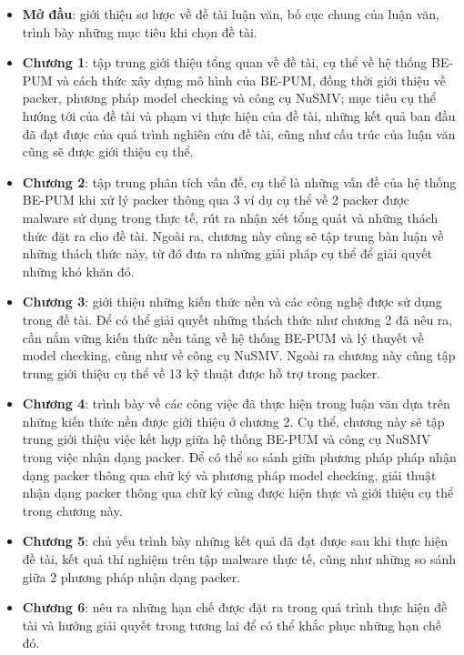 \begin{itemize}
\item{\textbf{Mở đầu}: giới thiệu sơ lược về đề tài luận văn, bố cục chung của luận văn, trình bày những mục tiêu khi chọn đề tài.\\}
\item{\textbf{Chương 1}: tập trung giới thiệu tổng quan về đề tài, cụ thể về hệ thống BE-PUM và cách thức xây dựng mô hình của BE-PUM, đồng thời giới thiệu về packer, phương pháp model checking và công cụ NuSMV; mục tiêu cụ thể hướng tới của đề tài và phạm vi thực hiện của đề tài, những kết quả ban đầu đã đạt được của quá trình nghiên cứu đề tài, cũng như cấu trúc của luận văn cũng sẽ được giới thiệu cụ thể.\\}
\item{\textbf{Chương 2}: tập trung phân tích vấn đề, cụ thể là những vấn đề của hệ thống BE-PUM khi xử lý packer thông qua 3 ví dụ cụ thể về 2 packer được malware sử dụng trong thực tế, rút ra nhận xét tổng quát và những thách thức đặt ra cho đề tài. Ngoài ra, chương này cũng sẽ tập trung bàn luận về những thách thức này, từ đó đưa ra những giải pháp cụ thể để giải quyết những khó khăn đó.\\}
\item{\textbf{Chương 3}: giới thiệu những kiến thức nền và các công nghệ được sử dụng trong đề tài. Để có thể giải quyết những thách thức như chương 2 đã nêu ra, cần nắm vững kiến thức nền tảng về hệ thống BE-PUM và lý thuyết về model checking, cũng như về công cụ NuSMV. Ngoài ra chương này cũng tập trung giới thiệu cụ thể về 13 kỹ thuật được hỗ trợ trong packer.\\}
\item{\textbf{Chương 4}: trình bày về các công việc đã thực hiện trong luận văn dựa trên những kiến thức nền được giới thiệu ở chương 2. Cụ thể, chương này sẽ tập trung giới thiệu việc kết hợp giữa hệ thống BE-PUM và công cụ NuSMV trong việc nhận dạng packer. Để có thể so sánh giữa phương pháp pháp nhận dạng packer thông qua chữ ký và phương pháp model checking, giải thuật nhận dạng packer thông qua chữ ký cũng được hiện thực và giới thiệu cụ thể trong chương này.\\}
\item{\textbf{Chương 5}: chủ yếu trình bày những kết quả đã đạt được sau khi thực hiện đề tài, kết quả thí nghiệm trên tập malware thực tế, cũng như những so sánh giữa 2 phương pháp nhận dạng packer.\\}
\item{\textbf{Chương 6}: nêu ra những hạn chế được đặt ra trong quá trình thực hiện đề tài và hướng giải quyết trong tương lai để có thể khắc phục những hạn chế đó.}
\end{itemize}

